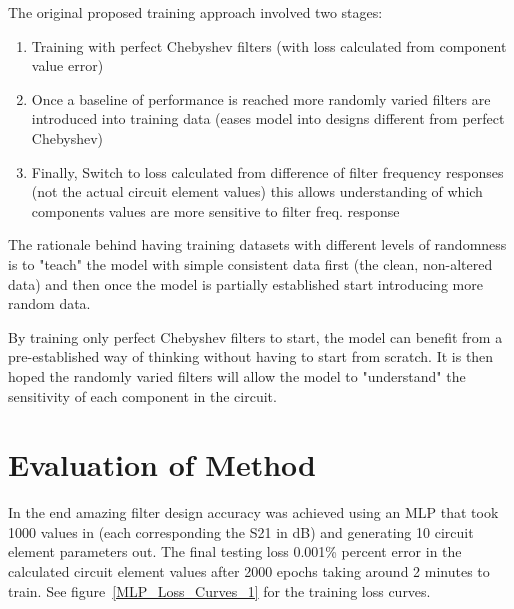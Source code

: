 \documentclass[10pt,conference]{IEEEtran}
\begin{document}
\vspace{1em}


The original proposed training approach involved two stages:
\begin{enumerate}[label=\arabic*)]
    \item Training with perfect Chebyshev filters (with loss calculated from component value error)
    \item Once a baseline of performance is reached more randomly varied filters are introduced into training data (eases model into designs different from perfect Chebyshev)
    \item Finally, Switch to loss calculated from difference of filter frequency responses (not the actual circuit element values)
    	\subitem this allows understanding of which components values are more sensitive to filter freq. response
\end{enumerate}

\vspace{1em}

The rationale behind having training datasets with different levels of randomness is to "teach" the model with simple consistent data first (the clean, non-altered data) and then once the model is partially established start introducing more random data.

By training only perfect Chebyshev filters to start, the model can benefit from a pre-established way of thinking without having to start from scratch. It is then hoped the randomly varied filters will allow the model to "understand" the sensitivity of each component in the circuit. 


\section{Evaluation of Method}


In the end amazing filter design accuracy was achieved using an MLP that took 1000 values in (each corresponding the S21 in dB) and generating 10 circuit element parameters out. The final testing loss 0.001\% percent error in the calculated circuit element values after 2000 epochs taking around 2 minutes to train. See figure~\ref{MLP_Loss_Curves_1} for the training loss curves.
\end{document}
